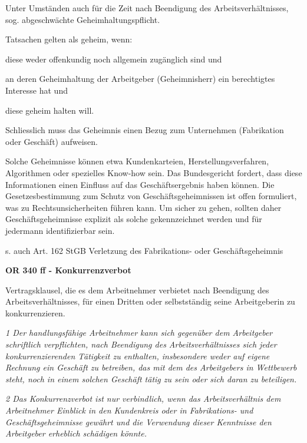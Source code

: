 \noindent
Unter Umständen auch für die Zeit nach Beendigung des Arbeitsverhältnisses, sog. abgeschwächte Geheimhaltungspflicht.

\noindent
Tatsachen gelten als geheim, wenn: 

diese weder offenkundig noch allgemein zugänglich sind und

an deren Geheimhaltung der Arbeitgeber (Geheimnisherr) ein berechtigtes Interesse hat und

diese geheim halten will.

Schliesslich muss das Geheimnis einen Bezug zum Unternehmen (Fabrikation oder Geschäft) aufweisen.

Solche Geheimnisse können etwa Kundenkarteien, Herstellungsverfahren, Algorithmen oder spezielles Know-how sein.
Das Bundesgericht fordert, dass diese Informationen einen Einfluss auf das Geschäftsergebnis haben können.
Die Gesetzesbestimmung zum Schutz von Geschäftsgeheimnissen ist offen formuliert, was zu Rechtsunsicherheiten führen kann. Um sicher zu gehen, sollten daher Geschäftsgeheimnisse explizit als solche gekennzeichnet werden und für jedermann identifizierbar sein.

\noindent
s. auch Art. 162 StGB Verletzung des Fabrikations- oder Geschäftsgeheimnis
\vspace{3mm}

\noindent
\textbf{OR 340 ff - Konkurrenzverbot}

\noindent
Vertragsklausel, die es dem Arbeitnehmer verbietet nach Beendigung des Arbeitsverhältnisses, für einen Dritten oder
selbstständig seine Arbeitgeberin zu konkurrenzieren.

\textit{1 Der handlungsfähige Arbeitnehmer kann sich gegenüber dem Arbeitgeber schriftlich verpflichten, nach Beendigung des Arbeitsverhältnisses sich jeder konkurrenzierenden Tätigkeit zu enthalten, insbesondere weder auf eigene Rechnung ein Geschäft zu betreiben, das mit dem des Arbeitgebers in Wettbewerb steht, noch in einem solchen Geschäft tätig zu sein oder sich daran zu beteiligen.}

\textit{2 Das Konkurrenzverbot ist nur verbindlich, wenn das Arbeitsverhältnis dem Arbeitnehmer Einblick in den Kundenkreis oder in Fabrikations- und Geschäftsgeheimnisse gewährt und die Verwendung dieser Kenntnisse den Arbeitgeber erheblich schädigen könnte.}
\vspace{3mm}

